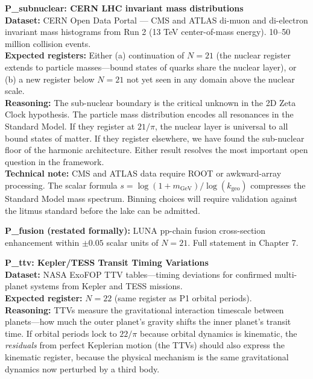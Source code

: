 \documentclass[11pt, letterpaper, openany]{book}
\begin{document}
\begin{predictionbox}
\textbf{P\_subnuclear: CERN LHC invariant mass distributions}\\[0.5em]
\textbf{Dataset:} CERN Open Data Portal --- CMS and ATLAS di-muon and di-electron
invariant mass histograms from Run 2 (13 TeV center-of-mass energy). 10--50 million
collision events.\\[0.5em]
\textbf{Expected registers:} Either (a) continuation of $N=21$ (the nuclear
register extends to particle masses---bound states of quarks share the nuclear
layer), or (b) a new register below $N=21$ not yet seen in any domain above the
nuclear scale.\\[0.5em]
\textbf{Reasoning:} The sub-nuclear boundary is the critical unknown in the 2D
Zeta Clock hypothesis. The particle mass distribution encodes all resonances in
the Standard Model. If they register at $21/\pi$, the nuclear layer is universal
to all bound states of matter. If they register elsewhere, we have found the
sub-nuclear floor of the harmonic architecture. Either result resolves the most
important open question in the framework.\\[0.5em]
\textbf{Technical note:} CMS and ATLAS data require ROOT or awkward-array
processing. The scalar formula $s = \log(1 + m_\text{GeV})/\log(k_\text{geo})$
compresses the Standard Model mass spectrum. Binning choices will require
validation against the litmus standard before the lake can be admitted.
\end{predictionbox}

\begin{predictionbox}
\textbf{P\_fusion (restated formally):} LUNA pp-chain fusion cross-section
enhancement within $\pm 0.05$ scalar units of $N=21$. Full statement in Chapter 7.
\end{predictionbox}

\begin{predictionbox}
\textbf{P\_ttv: Kepler/TESS Transit Timing Variations}\\[0.5em]
\textbf{Dataset:} NASA ExoFOP TTV tables---timing deviations for confirmed
multi-planet systems from Kepler and TESS missions.\\[0.5em]
\textbf{Expected register:} $N=22$ (same register as P1 orbital periods).\\[0.5em]
\textbf{Reasoning:} TTVs measure the gravitational interaction timescale between
planets---how much the outer planet's gravity shifts the inner planet's transit
time. If orbital periods lock to $22/\pi$ because orbital dynamics is kinematic,
the \emph{residuals} from perfect Keplerian motion (the TTVs) should also express
the kinematic register, because the physical mechanism is the same gravitational
dynamics now perturbed by a third body.
\end{predictionbox}
\end{document}
